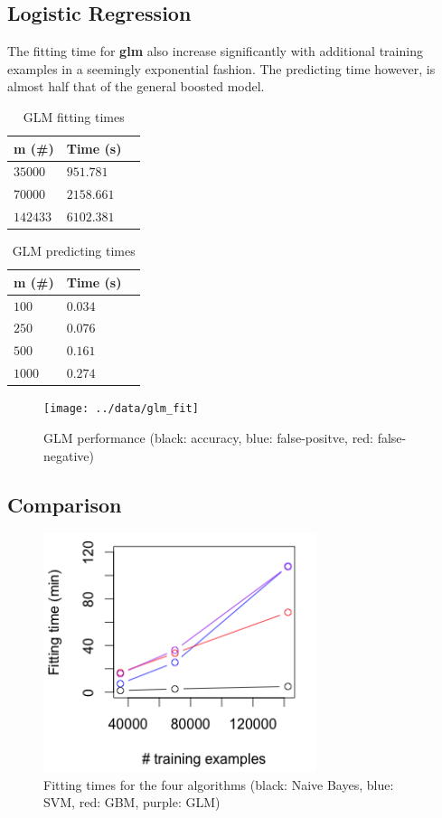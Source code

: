 \documentclass[twoside]{article}
\begin{document}
\begin{multicols}{2}
\subsection{Logistic Regression}
The fitting time for \textbf{glm} also increase significantly with additional training examples in a seemingly exponential fashion. The predicting time however, is almost half that of the general boosted model.

\begin{table}[H]
\caption{GLM fitting times}
\centering
\begin{tabular}{llr}
\toprule
m (\#) & Time (s) \\
\midrule
$35000$ & $951.781$ \\
$70000$ & $2158.661$ \\
$142433$ & $6102.381$ \\
\bottomrule
\end{tabular}
\end{table}

\begin{table}[H]
\caption{GLM predicting times}
\centering
\begin{tabular}{llr}
\toprule
m (\#) & Time (s) \\
\midrule
$100$ & $0.034$ \\
$250$ & $0.076$ \\
$500$ & $0.161$ \\
$1000$ & $0.274$ \\
\bottomrule
\end{tabular}
\end{table}

\begin{figure}[H]
 \caption{GLM performance (black: accuracy, blue: false-positve, red: false-negative)}
  \centering
    \texttt{[image: ../data/glm\_fit]}
\end{figure}

\subsection{Comparison}

\begin{figure}[H]
 \caption{Fitting times for the four algorithms (black: Naive Bayes, blue: SVM, red: GBM, purple: GLM)}
  \centering
    \includegraphics[width=8cm]{../data/all_fit}
\end{figure}


\end{multicols}
\end{document}
